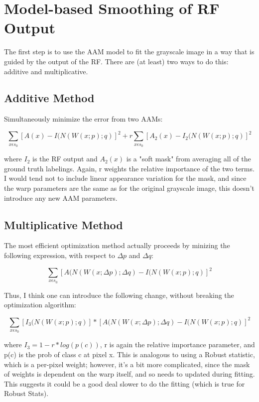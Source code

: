 \documentclass[10pt,twocolumn,letterpaper]{article}
\begin{document}
\section{Model-based Smoothing of RF Output}

The first step is to use the AAM model to fit the grayscale image in a way that is guided by the output of the RF.  There are (at least) two ways to do this: additive and multiplicative.

\subsection{Additive Method}

Simultaneously minimize the error from two AAMs:

\[ \sum_{x \epsilon s_0} [A(x) - I(N(W(x;p);q)]^2 + r\sum_{x \epsilon s_0} [A_2(x) - I_2(N(W(x;p);q)]^2 \]

where $I_2$ is the RF output and $A_2(x)$ is a "soft mask" from averaging all of the ground truth labelings.  Again, r weights the relative importance of the two terms.  I would tend not to include linear appearance variation for the mask, and since the warp parameters are the same as for the original grayscale image, this doesn't introduce any new AAM parameters.

\subsection{Multiplicative Method}

The most efficient optimization method actually proceeds by minizing the following expression, with respect to $\Delta p$ and $\Delta q$:

\[ \sum_{x \epsilon s_0} [A(N(W(x;\Delta p);\Delta q) - I(N(W(x;p);q)]^2 \]

Thus, I think one can introduce the following change, without breaking the optimization algorithm:

\[ \sum_{x \epsilon s_0} [I_3(N(W(x;p);q)]*[A(N(W(x;\Delta p);\Delta q) - I(N(W(x;p);q)]^2 \]

where $I_3 = 1 - r*log(p(c))$, r is again the relative importance parameter, and p(c) is the prob of class c at pixel x.  This is analogous to using a Robust statistic, which is a per-pixel weight; however, it's a bit more complicated, since the mask of weights is dependent on the warp itself, and so needs to updated during fitting.  This suggests it could be a good deal slower to do the fitting (which is true for Robust Stats).
\end{document}
